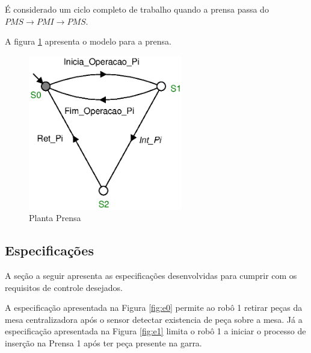 É considerado um ciclo completo de trabalho quando a prensa passa do $PMS \to PMI \to PMS$. 

A figura \ref{fig:prensa} apresenta o modelo para a prensa.

\begin{figure}[H]%
    \centering
    \includegraphics[width=0.6\textwidth]{imagens/Prensa.eps}
    \caption{Planta Prensa}\label{fig:prensa}
\end{figure}

\subsection{Especificações}
A seção a seguir apresenta as especificações desenvolvidas para cumprir com os requisitos de controle desejados.

A especificação apresentada na Figura \ref{fig:e0} permite ao robô 1 retirar peças da mesa centralizadora após o sensor detectar existencia de peça sobre a mesa.
Já a especificação apresentada na Figura \ref{fig:e1} limita o robô 1 a iniciar o processo de inserção na Prensa 1 após ter peça presente na garra.

